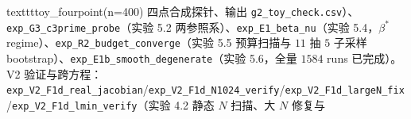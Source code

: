 \documentclass[fontset=windows,11pt]{ctexart}
\numberwithin{equation}{section}
\begin{document}
texttt{toy\_\hspace{0pt}fourpoint(n=400)} 四点合成探针、输出 \texttt{g2\_\hspace{0pt}toy\_\hspace{0pt}check.csv}）、\texttt{exp\_\hspace{0pt}G3\_\hspace{0pt}c3prime\_\hspace{0pt}probe}（实验 5.2 两参照系）、\texttt{exp\_\hspace{0pt}E1\_\hspace{0pt}beta\_\hspace{0pt}nu}（实验 5.4，$\beta^*$ regime）、\texttt{exp\_\hspace{0pt}R2\_\hspace{0pt}budget\_\hspace{0pt}converge}（实验 5.5 预算扫描与 $11$ 抽 $5$ 子采样 bootstrap）、\texttt{exp\_\hspace{0pt}E1b\_\hspace{0pt}smooth\_\hspace{0pt}degenerate}（实验 5.6，全量 $1584$ runs 已完成）。V2 验证与跨方程：\texttt{exp\_\hspace{0pt}V2\_\hspace{0pt}F1d\_\hspace{0pt}real\_\hspace{0pt}jacobian}/\hspace{0pt}\texttt{exp\_\hspace{0pt}V2\_\hspace{0pt}F1d\_\hspace{0pt}N1024\_\hspace{0pt}verify}/\hspace{0pt}\texttt{exp\_\hspace{0pt}V2\_\hspace{0pt}F1d\_\hspace{0pt}largeN\_\hspace{0pt}fix}/\hspace{0pt}\texttt{exp\_\hspace{0pt}V2\_\hspace{0pt}F1d\_\hspace{0pt}lmin\_\hspace{0pt}verify}（实验 4.2 静态 $N$ 扫描、大 $N$ 修复与 
\end{document}
